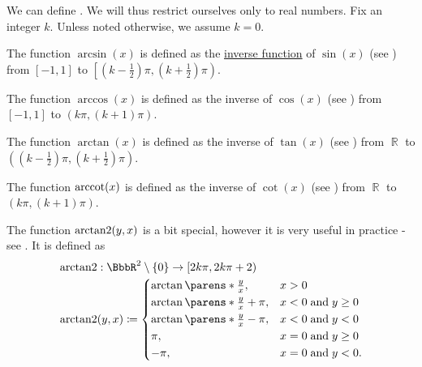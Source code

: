 \begin{definition}\label{def:inverse_trigonometric_functions}
  We can define . We will thus restrict ourselves only to real numbers. Fix an integer \( k \). Unless noted otherwise, we assume \( k = 0 \).

  \begin{thmenum}
     The  function \( \arcsin(x) \) is defined as the \hyperref[def:function/inverse]{inverse function} of \( \sin(x) \) (see ) from \( [-1, 1] \) to \( \left[(k - \tfrac 1 2) \pi, (k + \tfrac 1 2) \pi \right) \).

     The  function \( \arccos(x) \) is defined as the inverse of \( \cos(x) \) (see ) from \( [-1, 1] \) to \( (k\pi, (k + 1)\pi) \).

     The  function \( \arctan(x) \) is defined as the inverse of \( \tan(x) \) (see ) from \( \BbbR \) to \( \left((k - \tfrac 1 2) \pi, (k + \tfrac 1 2) \pi \right) \).

     The  function \( \operatorname{arccot}(x) \) is defined as the inverse of \( \cot(x) \) (see ) from \( \BbbR \) to \( (k\pi, (k + 1)\pi) \).

     The  function \( \operatorname{arctan2}(y, x) \) is a bit special, however it is very useful in practice - see . It is defined as
    \begin{align*}
       &\arctantwo: \BbbR^2 \setminus \{ 0 \} \to [2k\pi, 2k\pi + 2)  \\
       &\arctantwo(y, x) \coloneqq \begin{dcases}
        \arctan \parens*{ \tfrac y x },       &x > 0                  \\
        \arctan \parens*{ \tfrac y x } + \pi, &x < 0 \T{and} y \geq 0 \\
        \arctan \parens*{ \tfrac y x } - \pi, &x < 0 \T{and} y < 0    \\
        \pi,                                 &x = 0 \T{and} y \geq 0 \\
        -\pi,                                &x = 0 \T{and} y < 0.
      \end{dcases}
    \end{align*}
  \end{thmenum}
\end{definition}

